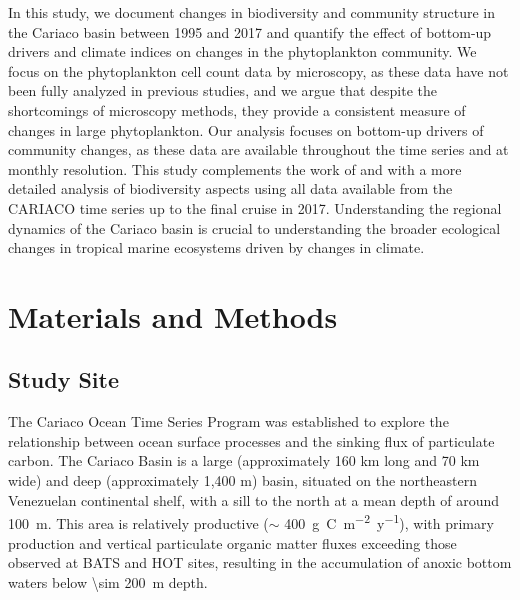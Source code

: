 \documentclass[draft]{agujournal2019}
\begin{document}
    In this study, we document changes in biodiversity and community structure in the Cariaco basin between 1995 and 2017 and quantify the effect of bottom-up drivers and climate indices on changes in the phytoplankton community. We focus on the phytoplankton cell count data by microscopy, as these data have not been fully analyzed in previous studies, and we argue that despite the shortcomings of microscopy methods, they provide a consistent measure of changes in large phytoplankton. Our analysis focuses on bottom-up drivers of community changes, as these data are available throughout the time series and at monthly resolution. This study complements the work of  and  with a more detailed analysis of biodiversity aspects using all data available from the CARIACO time series up to the final cruise in 2017. Understanding the regional dynamics of the Cariaco basin is crucial to understanding the broader ecological changes in tropical marine ecosystems driven by changes in climate. 


   


\section{Materials and Methods}
%
\subsection{Study Site}
    The Cariaco Ocean Time Series Program was established to explore the relationship between ocean surface processes and the sinking flux of particulate carbon. The Cariaco Basin is a large (approximately 160 km long and 70 km wide) and deep (approximately 1,400 m) basin, situated on the northeastern Venezuelan continental shelf, with a sill to the north at a mean depth of around \qty{100}{m}. This area is relatively productive ($\sim$ \qty{400}{g.C.m^{-2}.y^{-1}}), with primary production and vertical particulate organic matter fluxes exceeding those observed at BATS and HOT sites, resulting in the accumulation of anoxic bottom waters below \qty{\sim 200}{m} depth.
\end{document}
